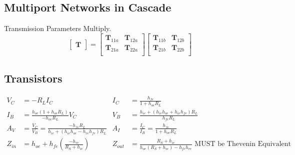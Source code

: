 	\subsection*{Multiport Networks in Cascade} \label{subsec:Cascade Multiport Networks}
	Transmission Parameters Multiply.
		\begin{equation*} \label{eq:Cascade Multiport Networks}
			\begin{bmatrix}
				\mathbf{T}
				\end{bmatrix}
			= \begin{bmatrix}
				\mathbf{T}_{11a} & \mathbf{T}_{12a} \\
				\mathbf{T}_{21a} & \mathbf{T}_{22a} \\
			\end{bmatrix}
			\begin{bmatrix}
				\mathbf{T}_{11b} & \mathbf{T}_{12b} \\
				\mathbf{T}_{21b} & \mathbf{T}_{22b} \\
			\end{bmatrix}
		\end{equation*}
	
	\vspace{-4mm}
	\subsection*{Transistors}
		\begin{align*}
			V_{C} &= -R_{L}I_{C} & I_{C} &= \frac{h_{fe}}{1+h_{oe}R_{L}} \\
			I_{B} &= \frac{h_{oe}\left( 1 + h_{oe}R_{L} \right)}{-h_{oe}R_{L}} V_{C} & V_{B} &= \frac{h_{ie}+\left( h_{ie}h_{oe} + h_{ie}h_{fe} \right)R_{L}}{h_{fe}R_{L}} \\ 
			A_{V} &= \frac{V_{C}}{V_{B}} = \frac{-h_{fe}R_{L}}{h_{ie}+\left(h_{ie}h_{oe} - h_{re}h_{fe} \right) R_{L}} & A_{I} &= \frac{I_{C}}{I_{B}} = \frac{h_{fe}}{1+h_{oe}R_{L}} \\
			Z_{in} &= h_{oe}+h_{fe}\left( \frac{-h_{re}}{R_{S}+h_{ie}} \right) & Z_{out} &= \frac{R_{S}+h_{ie}}{h_{oe} \left( R_{S} + h_{ie} \right) - h_{fe}h_{re}} \text{ MUST be Thevenin Equivalent} \\
		\end{align*}